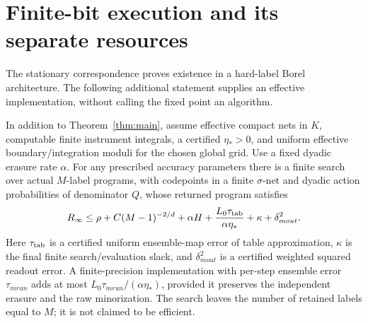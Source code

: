 \section{Finite-bit execution and its separate resources}\label{sec:compilation}
The stationary correspondence proves existence in a hard-label Borel architecture. The following additional statement supplies an effective implementation, without calling the fixed point an algorithm.

\begin{proposition}\label{prop:compilation}
In addition to Theorem~\ref{thm:main}, assume effective compact nets in $K$, computable finite instrument integrals, a certified $\eta_*>0$, and uniform effective boundary/integration moduli for the chosen global grid. Use a fixed dyadic erasure rate $\alpha$. For any prescribed accuracy parameters there is a finite search over actual $M$-label programs, with codepoints in a finite $\sigma$-net and dyadic action probabilities of denominator $Q$, whose returned program satisfies
\begin{equation}\label{eq:compiled}
 R_\infty\le \rho+C(M-1)^{-2/d}+\alpha H
 +\frac{L_0\tau_{\rm tab}}{\alpha\eta_*}+\kappa+\delta_{
m out}^2.
\end{equation}
Here $\tau_{\rm tab}$ is a certified uniform ensemble-map error of table approximation, $\kappa$ is the final finite search/evaluation slack, and $\delta_{
m out}^2$ is a certified weighted squared readout error. A finite-precision implementation with per-step ensemble error $\tau_{
m run}$ adds at most $L_0\tau_{
m run}/(\alpha\eta_*)$, provided it preserves the independent erasure and the raw minorization. The search leaves the number of retained labels equal to $M$; it is not claimed to be efficient.
\end{proposition}
